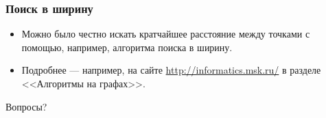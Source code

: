 \begin{frame}
    \frametitle{Поиск в ширину}

    \begin{itemize}
        \item Можно было честно искать кратчайшее расстояние между точками с помощью, например, алгоритма поиска в ширину.
        \item Подробнее --- например, на сайте \url{http://informatics.msk.ru/} в разделе <<Алгоритмы на графах>>.
    \end{itemize}
\end{frame}

\begin{frame}
    \begin{center}
        \Huge Вопросы?
    \end{center}
\end{frame}

